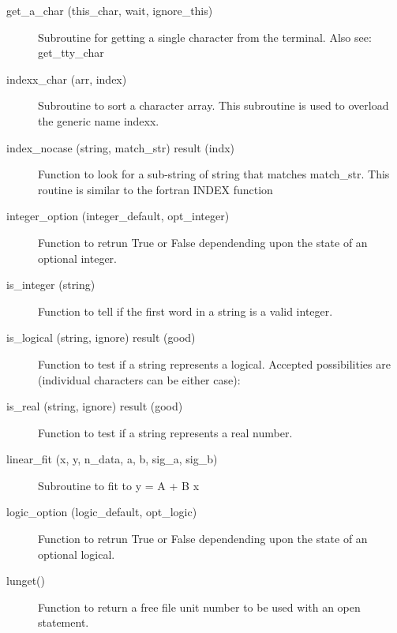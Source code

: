 \begin{description}
\label{r:get.a.char}
\item[get_a_char (this_char, wait, ignore_this)] \Newline 
Subroutine for getting a single character from the terminal.
Also see: get_tty_char

\label{r:indexx.char}
\item[indexx_char (arr, index)] \Newline 
Subroutine to sort a character array.
This subroutine is used to overload the generic name indexx.

\label{r:index.nocase}
\item[index_nocase (string, match_str) result (indx)] \Newline 
Function to look for a sub-string of string that matches match_str.
This routine is similar to the fortran INDEX function

\label{r:integer.option}
\item[integer_option (integer_default, opt_integer)] \Newline 
Function to retrun True or False dependending upon the state of an 
optional integer.

\label{r:is.integer}
\item[is_integer (string)] \Newline 
Function to tell if the first word in a string is a valid integer.

\label{r:is.logical}
\item[is_logical (string, ignore) result (good)] \Newline 
Function to test if a string represents a logical.
Accepted possibilities are (individual characters can be either case):

\label{r:is.real}
\item[is_real (string, ignore) result (good)] \Newline 
Function to test if a string represents a real number.

\label{r:linear.fit}
\item[linear_fit (x, y, n_data, a, b, sig_a, sig_b)] \Newline 
Subroutine to fit to y = A + B x

\label{r:logic.option}
\item[logic_option (logic_default, opt_logic)] \Newline 
Function to retrun True or False dependending upon the state of an 
optional logical.

\label{r:lunget}
\item[lunget()] \Newline 
Function to return a free file unit number to be used with an open statement.


\end{description}
